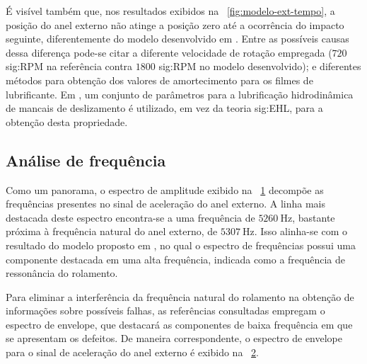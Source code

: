 \documentclass[12pt,oneside,english,brazil,lmodern,siglas,simbolos,cite=num]{ucsmonograph}
\begin{document}
	É visível também que, nos resultados exibidos na \figurename\ \ref{fig:modelo-ext-tempo}, a posição do anel externo não atinge a posição zero até a ocorrência do impacto seguinte, diferentemente do modelo desenvolvido em \cite{sassi:2007}.
	Entre as possíveis causas dessa diferença pode-se citar a diferente velocidade de rotação empregada ($720$ \gls{sig:RPM} na referência contra $1800$ \gls{sig:RPM} no modelo desenvolvido);
	e diferentes métodos para obtenção dos valores de amortecimento para os filmes de lubrificante.
	Em \cite{sassi:2007}, um conjunto de parâmetros para a lubrificação hidrodinâmica de mancais de deslizamento é utilizado, em vez da teoria \gls{sig:EHL}, para a obtenção desta propriedade.
	
	\subsection{Análise de frequência}
	Como um panorama, o espectro de amplitude exibido na \figurename\ \ref{fig:modelo-ext-ampspec} decompõe as frequências presentes no sinal de aceleração do anel externo.
	A linha mais destacada deste espectro encontra-se a uma frequência de $5260\ \text{Hz}$, bastante próxima à frequência natural do anel externo, de $5307\ \text{Hz}$.
	Isso alinha-se com o resultado do modelo proposto em \cite{sassi:2007}, no qual o espectro de frequências possui uma componente destacada em uma alta frequência, indicada como a frequência de ressonância do rolamento.
	
	\begin{figure}[ht]
		\label{fig:modelo-ext-ampspec}
	\end{figure}

	Para eliminar a interferência da frequência natural do rolamento na obtenção de informações sobre possíveis falhas, as referências consultadas empregam o espectro de envelope, que destacará as componentes de baixa frequência em que se apresentam os defeitos.
	De maneira correspondente, o espectro de envelope para o sinal de aceleração do anel externo é exibido na \figurename\ \ref{fig:modelo-ext-envspec-total}.

	\begin{figure}[ht]
		\label{fig:modelo-ext-envspec-total}
	\end{figure}
\end{document}
